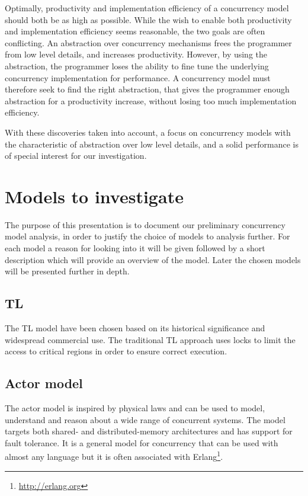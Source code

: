 Optimally, productivity and implementation efficiency of a concurrency model should both be as high as possible. While the wish to enable both productivity and implementation efficiency seems reasonable, the two goals are often conflicting. An abstraction over concurrency mechanisms frees the programmer from low level details, and increases productivity. However, by using the abstraction, the programmer loses the ability to fine tune the underlying concurrency implementation for performance. A concurrency model must therefore seek to find the right abstraction, that gives the programmer enough abstraction for a productivity increase, without losing too much implementation efficiency.

With these discoveries taken into account, a focus on concurrency models with the characteristic of abstraction over low level details, and a solid performance is of special interest for our investigation.

\section{Models to investigate}

The purpose of this presentation is to document our preliminary concurrency model analysis, in order to justify the choice of models to analysis further. For each model a reason for looking into it will be given followed by a short description which will provide an overview of the model. Later the chosen models will be presented further in depth.

\subsection{\acl{TL}}
The \ac{TL} model have been chosen based on its historical significance and widespread commercial use\cite[p. 58]{sutter2005software}. The traditional \ac{TL} approach uses locks to limit the access to critical regions in order to ensure correct execution\cite[p. 1]{saha2006mcrt}. 

\subsection{Actor model}
The actor model is inspired by physical laws and can be used to model, understand and reason about a wide range of concurrent systems\cite{hewitt2014actor}. The model targets both shared- and distributed-memory architectures and has support for fault tolerance\cite[Chap. 5]{sevenModels}. It is a general model for concurrency that can be used with almost any language but it is often associated with Erlang\footnote{\url{http://erlang.org}}.
 
